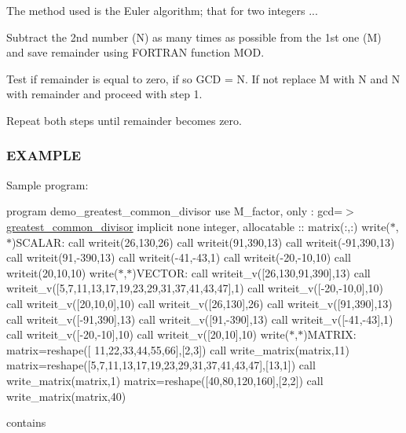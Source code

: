 The method used is the Euler algorithm; that for two integers ...


\begin{DoxyEnumerate}
\item Subtract the 2nd number (N) as many times as possible from the 1st one (M) and save remainder using F\+O\+R\+T\+R\+AN function M\+OD.
\item Test if remainder is equal to zero, if so G\+CD = N. If not replace M with N and N with remainder and proceed with step 1.
\item Repeat both steps until remainder becomes zero.
\end{DoxyEnumerate}

\subsubsection*{E\+X\+A\+M\+P\+LE}

Sample program\+:

program demo\+\_\+greatest\+\_\+common\+\_\+divisor use M\+\_\+factor, only \+: gcd=$>$\hyperlink{interfacem__factor_1_1greatest__common__divisor}{greatest\+\_\+common\+\_\+divisor} implicit none integer, allocatable \+:\+: matrix(\+:,\+:) write($\ast$,$\ast$)\textquotesingle{}S\+C\+A\+L\+AR\+:\textquotesingle{} call writeit(26,130,26) call writeit(91,390,13) call writeit(-\/91,390,13) call writeit(91,-\/390,13) call writeit(-\/41,-\/43,1) call writeit(-\/20,-\/10,10) call writeit(20,10,10) write($\ast$,$\ast$)\textquotesingle{}V\+E\+C\+T\+OR\+:\textquotesingle{} call writeit\+\_\+v(\mbox{[}26,130,91,390\mbox{]},13) call writeit\+\_\+v(\mbox{[}5,7,11,13,17,19,23,29,31,37,41,43,47\mbox{]},1) call writeit\+\_\+v(\mbox{[}-\/20,-\/10,0\mbox{]},10) call writeit\+\_\+v(\mbox{[}20,10,0\mbox{]},10) call writeit\+\_\+v(\mbox{[}26,130\mbox{]},26) call writeit\+\_\+v(\mbox{[}91,390\mbox{]},13) call writeit\+\_\+v(\mbox{[}-\/91,390\mbox{]},13) call writeit\+\_\+v(\mbox{[}91,-\/390\mbox{]},13) call writeit\+\_\+v(\mbox{[}-\/41,-\/43\mbox{]},1) call writeit\+\_\+v(\mbox{[}-\/20,-\/10\mbox{]},10) call writeit\+\_\+v(\mbox{[}20,10\mbox{]},10) write($\ast$,$\ast$)\textquotesingle{}M\+A\+T\+R\+IX\+:\textquotesingle{} matrix=reshape(\mbox{[} 11,22,33,44,55,66\mbox{]},\mbox{[}2,3\mbox{]}) call write\+\_\+matrix(matrix,11) matrix=reshape(\mbox{[}5,7,11,13,17,19,23,29,31,37,41,43,47\mbox{]},\mbox{[}13,1\mbox{]}) call write\+\_\+matrix(matrix,1) matrix=reshape(\mbox{[}40,80,120,160\mbox{]},\mbox{[}2,2\mbox{]}) call write\+\_\+matrix(matrix,40)

contains

